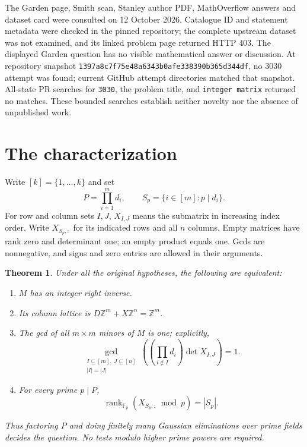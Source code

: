 \documentclass[11pt]{article}
\newtheorem{theorem}{Theorem}
\DeclareMathOperator{\rank}{rank}
\newcommand{\Z}{\mathbb Z}
\newcommand{\F}{\mathbb F}
\begin{document}
The Garden page, Smith scan, Stanley author PDF, MathOverflow answers
and dataset card were consulted on 12 October 2026. Catalogue ID and
statement metadata were checked in the pinned repository; the complete
upstream dataset was not examined, and its linked problem page returned
HTTP 403. The displayed
Garden question has no visible mathematical answer or discussion.
At repository snapshot
\texttt{1397a8c7f75e48a6343b0afe338390b365d344df}, no 3030 attempt
was found; current GitHub attempt directories matched that snapshot.
All-state PR searches for \texttt{3030}, the problem title, and
\texttt{integer matrix} returned no matches. These bounded searches
establish neither novelty nor the absence of unpublished work.

\section{The characterization}
Write $[k]=\{1,\ldots,k\}$ and set
\[
 P=\prod_{i=1}^m d_i,
 \qquad S_p=\{i\in[m]:p\mid d_i\}.
\]
For row and column sets $I,J$, $X_{I,J}$ means the submatrix in
increasing index order. Write $X_{S_p,:}$ for its indicated rows and
all $n$ columns. Empty matrices have rank zero and determinant one;
an empty product equals one. Gcds are nonnegative, and signs and zero
entries are allowed in their arguments.

\begin{theorem}\label{thm:criterion}
Under all the original hypotheses, the following are equivalent:
\begin{enumerate}
\item $M$ has an integer right inverse.
\item Its column lattice is $D\Z^m+X\Z^n=\Z^m$.
\item The gcd of all $m\times m$ minors of $M$ is one; explicitly,
\begin{equation}\label{eq:weighted}
 \gcd_{\substack{I\subseteq[m],\ J\subseteq[n]\\|I|=|J|}}
 \left(\left(\prod_{i\notin I}d_i\right)\det X_{I,J}\right)=1.
\end{equation}
\item For every prime $p\mid P$,
\begin{equation}\label{eq:local}
 \rank_{\F_p}(X_{S_p,:}\bmod p)=|S_p|.
\end{equation}
\end{enumerate}
Thus factoring $P$ and doing finitely many Gaussian eliminations over
prime fields decides the question. No tests modulo higher prime powers
are required.
\end{theorem}
\end{document}
